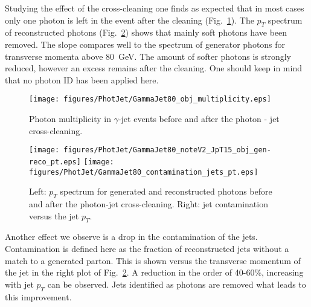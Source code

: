 \documentclass{cmspaper}
\begin{document}
Studying the effect of the cross-cleaning one finds as expected that in most
cases only one photon is left in the event after the cleaning
(Fig.~\ref{fig:pjPhotMult}). The $p_T$ spectrum of reconstructed photons
(Fig.~\ref{fig:pjPhotCont}) shows that mainly soft photons have been removed.
The slope compares well to the spectrum of generator photons for transverse
momenta above 80\ GeV. The amount of softer photons is strongly reduced,
however an excess remains after the cleaning. One should keep in mind that no
photon ID has been applied here.
\begin{figure}[hbtp]
  \begin{center}
    \texttt{[image: figures/PhotJet/GammaJet80\_obj\_multiplicity.eps]}
    \caption{Photon multiplicity in $\gamma$-jet events before and after the
    photon - jet cross-cleaning.}
    \label{fig:pjPhotMult}
  \end{center}
\end{figure}
\begin{figure}[hbtp]
  \begin{center}
    \texttt{[image: figures/PhotJet/GammaJet80\_noteV2\_JpT15\_obj\_gen-reco\_pt.eps]}
    \texttt{[image: figures/PhotJet/GammaJet80\_contamination\_jets\_pt.eps]}
    \caption{Left: $p_T$ spectrum for generated and reconstructed photons
    before and after the photon-jet cross-cleaning. Right: jet contamination
    versus the jet $p_T$.}
    \label{fig:pjPhotCont}
  \end{center}
\end{figure}

Another effect we observe is a drop in the contamination of the jets.
Contamination is defined here as the fraction of reconstructed jets without a
match to a generated parton. This is shown versus the transverse momentum of
the jet in the right plot of Fig.~\ref{fig:pjPhotCont}. A reduction in the
order of 40-60\%, increasing with jet $p_T$ can be observed. Jets identified as
photons are removed what leads to this improvement.
\end{document}
